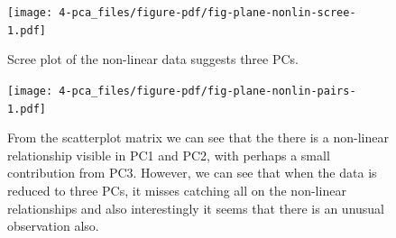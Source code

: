 \documentclass[
  letterpaper,
]{krantz}
\newenvironment{Shaded}{\begin{snugshade}}{\end{snugshade}}
\newcommand{\AttributeTok}[1]{\textcolor[rgb]{0.40,0.45,0.13}{#1}}
\newcommand{\DecValTok}[1]{\textcolor[rgb]{0.68,0.00,0.00}{#1}}
\newcommand{\FloatTok}[1]{\textcolor[rgb]{0.68,0.00,0.00}{#1}}
\newcommand{\FunctionTok}[1]{\textcolor[rgb]{0.28,0.35,0.67}{#1}}
\newcommand{\NormalTok}[1]{\textcolor[rgb]{0.00,0.23,0.31}{#1}}
\newcommand{\SpecialCharTok}[1]{\textcolor[rgb]{0.37,0.37,0.37}{#1}}
\newcommand{\StringTok}[1]{\textcolor[rgb]{0.13,0.47,0.30}{#1}}
\begin{document}
\begin{figure}[H]

{\centering \texttt{[image: 4-pca\_files/figure-pdf/fig-plane-nonlin-scree-1.pdf]}

}

\caption{\label{fig-plane-nonlin-scree}Scree plot of the non-linear data
suggests three PCs.}

\end{figure}

\begin{Shaded}
\end{Shaded}

\begin{Shaded}
\end{Shaded}

\begin{figure}[H]

{\centering \texttt{[image: 4-pca\_files/figure-pdf/fig-plane-nonlin-pairs-1.pdf]}

}

\caption{\label{fig-plane-nonlin-pairs}From the scatterplot matrix we
can see that the there is a non-linear relationship visible in PC1 and
PC2, with perhaps a small contribution from PC3. However, we can see
that when the data is reduced to three PCs, it misses catching all on
the non-linear relationships and also interestingly it seems that there
is an unusual observation also.}

\end{figure}
\end{document}
